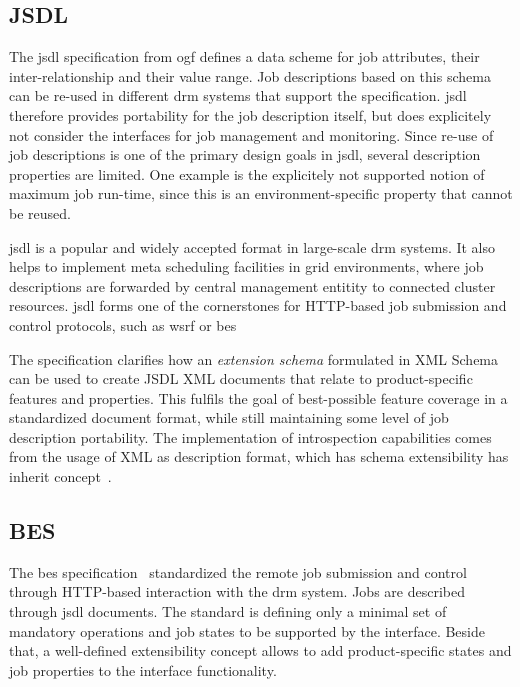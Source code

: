 \documentclass[twocolumn]{svjour3}       %
\begin{document}
\subsection{JSDL}

The \gls{jsdl} specification from \gls{ogf} defines a data scheme for job attributes, their inter-relationship and their value range. Job descriptions based on this schema can be re-used in different \gls{drm} systems that support the specification. \gls{jsdl} therefore provides portability for the job description itself, but does explicitely not consider the interfaces for job management and monitoring. Since re-use of job descriptions is one of the primary design goals in \gls{jsdl}, several description properties are limited. One example is the explicitely not supported notion of maximum job run-time, since this is an environment-specific property that cannot be reused.

\gls{jsdl} is a popular and widely accepted format in large-scale \gls{drm} systems. It also helps to implement meta scheduling facilities in grid environments, where job descriptions are forwarded by central management entitity to connected cluster resources. \gls{jsdl} forms one of the cornerstones for HTTP-based job submission and control protocols, such as \gls{wsrf} or \gls{bes}

The specification clarifies how an \emph{extension schema} formulated in XML Schema can be used to create JSDL XML documents that relate to product-specific features and properties. This fulfils the goal of best-possible feature coverage in a standardized document format, while still maintaining some level of job description portability. The implementation of introspection capabilities comes from the usage of XML as description format, which has schema extensibility has inherit concept~\cite{xmlschema}. 

\subsection{BES}

The \gls{bes} specification~\cite{gfd.108} standardized the remote job submission and control through HTTP-based interaction with the \gls{drm} system. Jobs are described through \gls{jsdl} documents. The standard is defining only a minimal set of mandatory operations and job states to be supported by the interface. Beside that, a well-defined extensibility concept allows to add product-specific states and job properties to the interface functionality. 
\end{document}
